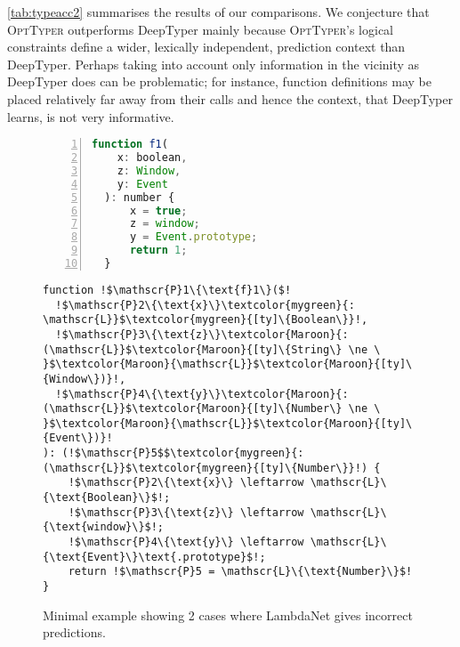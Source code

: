 \documentclass[acmsmall, review, anonymous]{acmart}\settopmatter{printfolios=true,printccs=false,printacmref=false}
\newcommand{\projectname}{\textsc{OptTyper}\xspace}
\begin{document}
\cref{tab:typeacc2} summarises the results of our comparisons. We conjecture that \projectname outperforms DeepTyper mainly because \projectname's logical constraints define
a wider, lexically independent, prediction context than DeepTyper.
Perhaps taking into account only information in the vicinity as DeepTyper does can be problematic;
for instance, function definitions may be placed relatively far away from their calls and hence the context, that DeepTyper learns, is not very informative.
\begin{figure}[!t]
    \centering
    \begin{minipage}[t]{.38\textwidth}
        \raggedright
\begin{lstlisting}[language=JavaScript,label={lst:gold}, numbers=left]
  function f1(
    x: boolean,
    z: Window,
    y: Event
  ): number {
      x = true;
      z = window;
      y = Event.prototype;
      return 1;
  }
\end{lstlisting}
    \vspace{-7mm}
    \end{minipage}
    \begin{minipage}[t]{.57\textwidth}
        \raggedleft
\begin{lstlisting}[language=Fake,label={lst:lncode}] 
function !$\mathscr{P}1\{\text{f}1\}($!
  !$\mathscr{P}2\{\text{x}\}\textcolor{mygreen}{: \mathscr{L}}$\textcolor{mygreen}{[ty]\{Boolean\}}!,
  !$\mathscr{P}3\{\text{z}\}\textcolor{Maroon}{: (\mathscr{L}}$\textcolor{Maroon}{[ty]\{String\} \ne \ }$\textcolor{Maroon}{\mathscr{L}}$\textcolor{Maroon}{[ty]\{Window\})}!,
  !$\mathscr{P}4\{\text{y}\}\textcolor{Maroon}{: (\mathscr{L}}$\textcolor{Maroon}{[ty]\{Number\} \ne \ }$\textcolor{Maroon}{\mathscr{L}}$\textcolor{Maroon}{[ty]\{Event\})}!
): (!$\mathscr{P}5$$\textcolor{mygreen}{: (\mathscr{L}}$\textcolor{mygreen}{[ty]\{Number\}}!) {
    !$\mathscr{P}2\{\text{x}\} \leftarrow \mathscr{L}\{\text{Boolean}\}$!;
    !$\mathscr{P}3\{\text{z}\} \leftarrow \mathscr{L}\{\text{window}\}$!;
    !$\mathscr{P}4\{\text{y}\} \leftarrow \mathscr{L}\{\text{Event}\}\text{.prototype}$!;
    return !$\mathscr{P}5 = \mathscr{L}\{\text{Number}\}$!
}
\end{lstlisting}
    \vspace{-7mm}
    \end{minipage}
    \caption{Minimal example showing 2 cases where LambdaNet gives incorrect predictions.}\label{fig:LambdaNet}
\end{figure}
\end{document}
